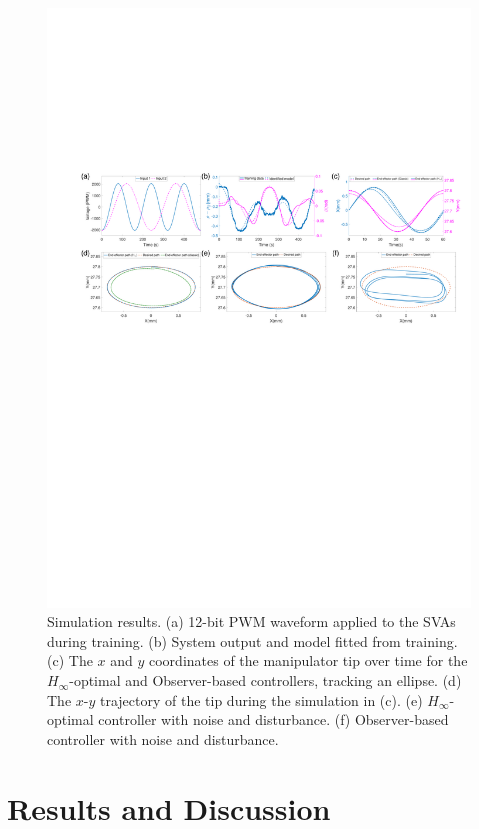 \begin{figure}[t]
\centering
    \includegraphics[width=\textwidth]{Figure_Sim_6.pdf}
    \caption{Simulation results. (a) 12-bit PWM waveform applied to the SVAs during training. (b) System output and model fitted from training. (c) The $x$ and $y$ coordinates of the manipulator tip over time for the $H_\infty$-optimal and Observer-based controllers, tracking an ellipse. (d) The $x$-$y$ trajectory of the tip during the simulation in (c).
    (e) $H_\infty$-optimal controller with noise and disturbance. (f) Observer-based controller with noise and disturbance.} \vspace{-0.5cm}
\label{fig:sim}
\end{figure}

\section{Results and Discussion}

